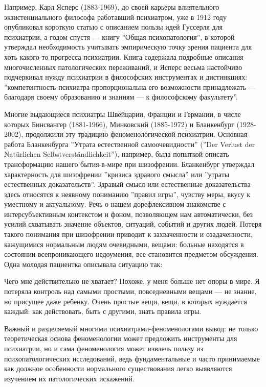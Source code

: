 \documentclass[11pt]{book}
\begin{document}
Например, Карл Ясперс (1883-1969), до своей карьеры влиятельного экзистенциального философа работавший психиатром, уже в 1912 году опубликовал короткую статью с описанием пользы идей Гуссерля для психиатрии, а годом спустя --- книгу ''Общая психопатология'', в которой утверждал необходимость учитывать эмпирическую точку зрения пациента для хоть какого-то прогресса психиатрии. Книга содержала подробные описания многочисленных патологических переживаний, и Ясперс весьма настойчиво подчеркивал нужду психиатрии в философских инструментах и дистинкциях: ''компетентность психиатра пропорциональна его возможности принадлежать --- благодаря своему образованию и знаниям --- к философскому факультету''.

Многие выдающиеся психиатры Швейцарии, Франции и Германии, в числе которых Бинсвангер (1881-1966), Минковский (1885-1972) и Бланкенбург (1928-2002), продолжили эту традицию феноменологической психиатрии. Основная работа Бланкенбурга ''Утрата естественной самоочевидности'' (''Der Verlust der Natürlichen Selbstverständlichkeit''), например, была попыткой описать трансформацию нашего бытия-в-мире при шизофрении. Бланкенбург утверждал характерность для шизофрении ''кризиса здравого смысла'' или ''утраты естественных доказательств''. Здравый смысл или естественные доказательства здесь относятся к неявному пониманию ''правил игры'', чувству меры, вкусу к уместному и актуальному. Речь о нашем дорефлексивном знакомстве с интерсубъективным контекстом и фоном, позволяющем нам автоматически, без усилий схватывать значение объектов, ситуаций, событий и других людей. Потеря такого понимания при шизофрении приводит к захваченности и озадаченности, кажущимися нормальным людям очевидными, вещами: больные находятся в состоянии всепроникающего недоумения, все становится предметом обсуждения. Одна молодая пациентка описывала ситуацию так:

\smallskip
{}\relax
{}\relax

Чего мне действительно не хватает? Похоже, у меня больше нет опоры в мире. Я потеряла контроль над самыми простыми, повседневными вещами --- не знание, но присущее даже ребенку. Очень простые вещи, вещи, в которых нуждается каждый: как действовать, быть с другими, знать правила игры.

\relax
{}\relax
\smallskip

Важный и разделяемый многими психиатрами-феноменологами вывод: не только теоретическая основа феноменологии может предложить инструменты для психиатрии, но и сама феноменология может извлечь пользу из психопатологических исследований, ведь фундаментальные и часто принимаемые как должное особенности нормального существования легко выявляются изучением их патологических искажений.
\end{document}
